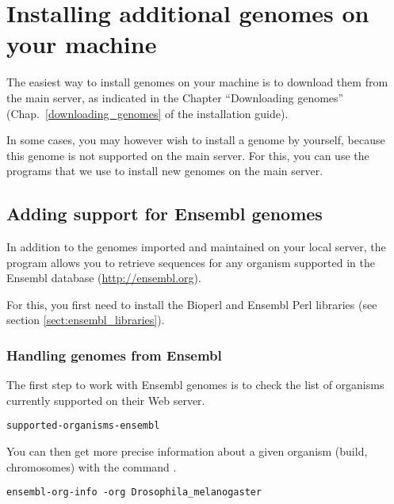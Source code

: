 

\chapter{Installing additional genomes on your machine}

The easiest way to install genomes on your machine is to download them
from the main \RSAT server, as indicated in the Chapter ``Downloading
genomes'' (Chap.~\ref{downloading_genomes} of the installation guide).

In some cases, you may however wish to install a genome by yourself,
because this genome is not supported on the main \RSAT server. For
this, you can use the programs that we use to install new genomes on
the main \RSAT server.

\section{Adding support for Ensembl genomes}

In addition to the genomes imported and maintained on your local \RSAT
server, the program  allows you to
retrieve sequences for any organism supported in the Ensembl database
(\url{http://ensembl.org}).

For this, you first need to install the Bioperl and Ensembl Perl
libraries (see section \ref{sect:ensembl_libraries}).

\subsection{Handling genomes from Ensembl}

The first step to work with Ensembl genomes is to check the list of
organisms currently supported on their Web server.

\begin{lstlisting}
supported-organisms-ensembl
\end{lstlisting}

You can then get more precise information about a given organism
(build, chromosomes) with the command .

\begin{lstlisting}
ensembl-org-info -org Drosophila_melanogaster
\end{lstlisting}

